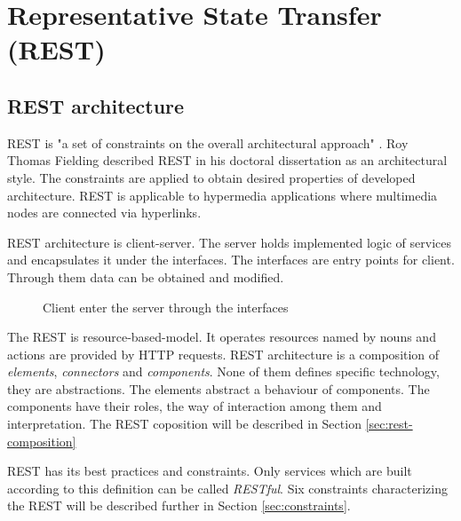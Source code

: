 \chapter{Representative State Transfer (REST)}
\label{chap:rest}


\section{REST architecture}
\label{sec:rest-architecture}

REST is "a set of constraints on the overall architectural approach" \cite{agile-architecture}. Roy Thomas Fielding described REST in his doctoral dissertation as an architectural style. The constraints are applied to obtain desired properties of developed architecture. REST is applicable to \gls{hypermedia} applications where multimedia nodes are connected via hyperlinks.

REST architecture is client-server. The server holds implemented logic of services and encapsulates it under the interfaces. The interfaces are entry points for client. Through them data can be obtained and modified. 

\begin{figure}[htp] 
\caption{Client enter the server through the interfaces}
\label{fig:communication-through-interface}
\end{figure} 


The REST is \gls{resource-based-model}. It operates resources named by nouns and actions are provided by HTTP requests. 
REST architecture is a composition of \emph{elements}, \emph{connectors} and \emph{components}. None of them defines specific technology, they are abstractions. The elements abstract a behaviour of components. The components have their roles, the way of interaction among them and interpretation. The REST coposition will be described in Section \ref{sec:rest-composition}

REST has its best practices and constraints. Only services which are built according to this definition can be called \emph{RESTful}. Six constraints characterizing the REST will be described further in Section \ref{sec:constraints}.

